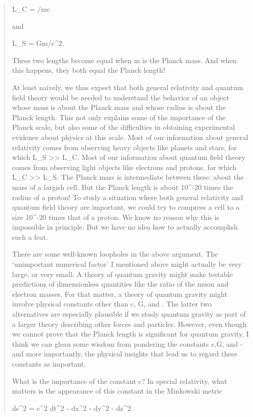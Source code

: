 \begin{quote}
                    L_C = \hbar /mc

and  

                    L_S = Gm/c^2. 

These two lengths become equal when m is the Planck mass.  And 
when this happens, they both equal the Planck length!

At least naively, we thus expect that both general relativity and
quantum field theory would be needed to understand the behavior of an
object whose mass is about the Planck mass and whose radius is about the
Planck length.  This not only explains some of the importance of the
Planck scale, but also some of the difficulties in obtaining
experimental evidence about physics at this scale.  Most of our
information about general relativity comes from observing heavy objects
like planets and stars, for which L_S >> L_C.  Most of our information
about quantum field theory comes from observing light objects like
electrons and protons, for which L_C >> L_S.  The Planck mass is
intermediate between these: about the mass of a largish cell.  But the
Planck length is about 10^{-20} times the radius of a proton!   To study
a situation where both general relativity and quantum field theory are
important, we could try to compress a cell to a size 10^{-20} times that
of a proton.   We know no reason why this is impossible in principle. 
But we have no idea how to actually accomplish such a feat.  

There are some well-known loopholes in the above argument.  The
`unimportant numerical factor' I mentioned above might actually be very
large, or very small.  A theory of quantum gravity might make testable
predictions of dimensionless quantities like the ratio of the muon and
electron masses.  For that matter, a theory of quantum gravity might
involve physical constants other than c, G, and \hbar .  The latter two
alternatives are especially plausible if we study quantum gravity as
part of a larger theory describing other forces and particles.  However,
even though we cannot prove that the Planck length is significant for
quantum gravity, I think we can glean some wisdom from pondering the
constants c,G, and \hbar  - and more importantly, the physical insights
that lead us to regard these constants as important.

What is the importance of the constant c?   In special relativity,
what matters is the appearance of this constant in the Minkowski
metric 

                ds^2 = c^2 dt^2 - dx^2 - dy^2 - dz^2  


\end{quote}
